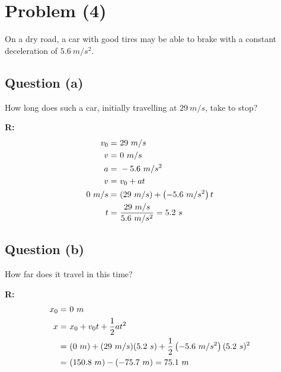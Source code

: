 \section{Problem (4)}
	On a dry road, a car with good tires may be able to brake with a constant deceleration of $5.6 \ m/s^{2}$.

	\subsection{Question (a)}
		How long does such a car, initially travelling at $29 \ m/s$, take to stop?

		\textbf{R:}
		\begin{align}
			v_{0} = \ &29 \ m/s& \notag \\
			v = \ &0 \ m/s& \notag \\
			a = \ &- 5.6 \ m/s^{2}& \notag \\
			v = \ &v_{0} + at& \notag \\
			0 \ m/s = \ &(29 \ m/s) + \left( -5.6 \ m/s^{2} \right) t& \notag \\
			t = \ &\frac{29 \ m/s}{5.6 \ m/s^{2}} = 5.2 \ s&
		\end{align}
	\subsection{Question (b)}
		How far does it travel in this time?

		\textbf{R:}
		\begin{align}
			x_{0} = \ &0 \ m& \notag \\
			x = \ &x_{0} + v_{0}t + \frac{1}{2}at^{2}& \notag \\
			= \ &(0 \ m) + (29 \ m/s)(5.2 \ s) + \frac{1}{2} \left( -5.6 \ m/s^{2} \right)(5.2 \ s)^{2}& \notag \\
			= \ &(150.8 \ m) - (-75.7 \ m) = 75.1 \ m&
		\end{align}
